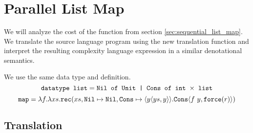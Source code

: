 %
%
\section{Parallel List Map}
We will analyze the cost of the  function from section
\ref{sec:sequential_list_map}. We translate the source language program using
the new translation function and interpret the resulting complexity language
expression in a similar denotational semantics.

We use the same data type  and  definition.
%
\begin{equation*}
  \texttt{datatype list} = \texttt{Nil of Unit | Cons of int $\times$ list}
\end{equation*}
%
\begin{equation*}
  \texttt{map} = \lambda f. \lambda xs . \texttt{rec}(xs, \texttt{Nil} \mapsto \texttt{Nil}, \texttt{Cons} \mapsto \langle y \langle ys, y \rangle\rangle. \texttt{Cons}\langle f\ y, \texttt{force}(r)\rangle)
\end{equation*}
%
\subsection{Translation}
